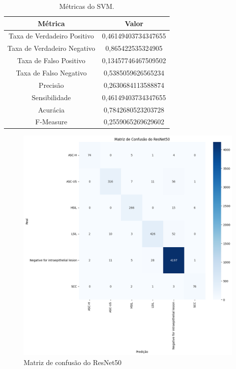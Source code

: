 \documentclass[12pt]{article}
\begin{document}
\begin{table}[]
    \centering
    \begin{tabular}{|c|c|}
        \hline
         Métrica & Valor\\
         \hline
         Taxa de Verdadeiro Positivo & 0,46149403734347655\\
         \hline
         Taxa de Verdadeiro Negativo & 0,865422535324905\\
         \hline
         Taxa de Falso Positivo & 0,13457746467509502\\
         \hline
         Taxa de Falso Negativo & 0,5385059626565234\\
         \hline
         Precisão & 0,2630684113588874\\
         \hline
         Sensibilidade & 0,46149403734347655\\
         \hline
         Acurácia & 0,7842680523203728\\
         \hline
         F-Measure & 0,2559065269629602\\
         \hline
    \end{tabular}
    \caption{Métricas do SVM.}
    \label{tab:metricas-svm}
\end{table}

\begin{figure}
    \centering
    \includegraphics[width=\textwidth]{Matriz confusao ResNet50.png}
    \caption{Matriz de confusão do ResNet50}
    \label{fig:matrix-confusao-resnet50}
\end{figure}
\end{document}

